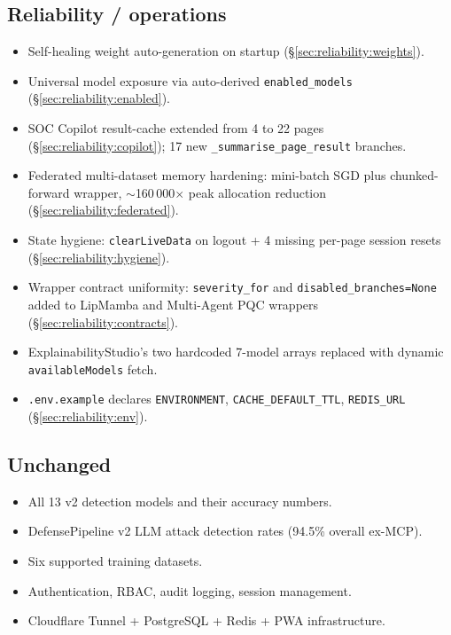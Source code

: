 \documentclass[11pt,a4paper]{article}
\begin{document}
\subsection*{Reliability / operations}
\begin{itemize}[nosep]
  \item Self-healing weight auto-generation on startup
        (\S\ref{sec:reliability:weights}).
  \item Universal model exposure via auto-derived \texttt{enabled\_models}
        (\S\ref{sec:reliability:enabled}).
  \item SOC Copilot result-cache extended from 4 to 22 pages
        (\S\ref{sec:reliability:copilot}); 17 new
        \texttt{\_summarise\_page\_result} branches.
  \item Federated multi-dataset memory hardening: mini-batch SGD plus
        chunked-forward wrapper, $\sim$160\,000$\times$ peak allocation
        reduction (\S\ref{sec:reliability:federated}).
  \item State hygiene: \texttt{clearLiveData} on logout + 4 missing
        per-page session resets (\S\ref{sec:reliability:hygiene}).
  \item Wrapper contract uniformity: \texttt{severity\_for} and
        \texttt{disabled\_branches=None} added to LipMamba and
        Multi-Agent PQC wrappers (\S\ref{sec:reliability:contracts}).
  \item ExplainabilityStudio's two hardcoded 7-model arrays replaced
        with dynamic \texttt{availableModels} fetch.
  \item \texttt{.env.example} declares \texttt{ENVIRONMENT},
        \texttt{CACHE\_DEFAULT\_TTL}, \texttt{REDIS\_URL}
        (\S\ref{sec:reliability:env}).
\end{itemize}

\subsection*{Unchanged}
\begin{itemize}[nosep]
  \item All 13 v2 detection models and their accuracy numbers.
  \item DefensePipeline v2 LLM attack detection rates (94.5\%
        overall ex-MCP).
  \item Six supported training datasets.
  \item Authentication, RBAC, audit logging, session management.
  \item Cloudflare Tunnel + PostgreSQL + Redis + PWA infrastructure.
\end{itemize}
\end{document}
